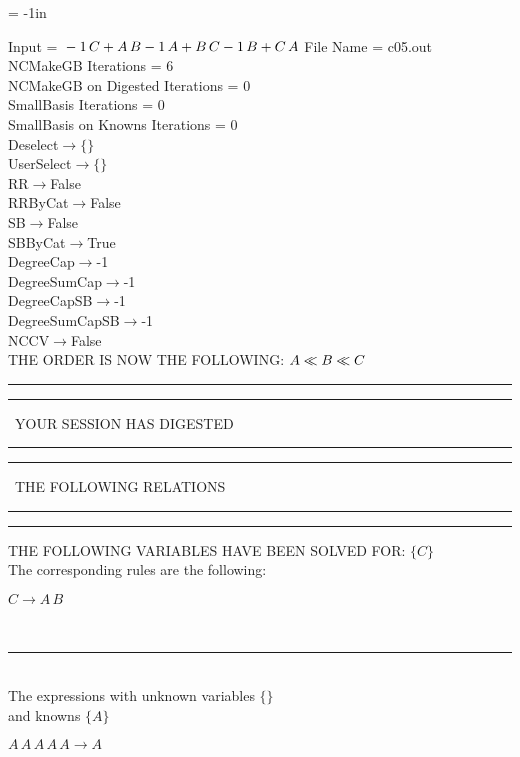 \voffset = -1in
\evensidemargin 0.1in
\oddsidemargin 0.1in
\textheight 9in
\textwidth 6in

\normalsize
\baselineskip=12pt
\noindent
Input = 
$
\\-1\,
 C + A\,
 B\\
-1\,
 A + B\,
 C\\
-1\,
 B + C\,
 A\\
$
File Name = c05.out\\
NCMakeGB Iterations = 6\\
NCMakeGB on Digested Iterations = 0\\
SmallBasis Iterations = 0\\
SmallBasis on Knowns Iterations = 0\\
Deselect$\rightarrow \{\}$\\
UserSelect$\rightarrow \{\}$\\
RR$\rightarrow $False\\
RRByCat$\rightarrow $False\\
SB$\rightarrow $False\\
SBByCat$\rightarrow $True\\
DegreeCap$\rightarrow $-1\\
DegreeSumCap$\rightarrow $-1\\
DegreeCapSB$\rightarrow $-1\\
DegreeSumCapSB$\rightarrow $-1\\
NCCV$\rightarrow $False\\
THE ORDER IS NOW THE FOLLOWING:\hfil\break
$
A\ll
B\ll
C\\
$
\rule[2pt]{6in}{4pt}\hfil\break
\rule[2pt]{1.879in}{4pt}
\ YOUR SESSION HAS DIGESTED\ 
\rule[2pt]{1.879in}{4pt}\hfil\break
\rule[2pt]{1.923in}{4pt}
\ THE FOLLOWING RELATIONS\ 
\rule[2pt]{1.923in}{4pt}\hfil\break
\rule[2pt]{6in}{4pt}\hfil\break
THE FOLLOWING VARIABLES HAVE BEEN SOLVED FOR:\hfil\break
$\{C\}$
\smallskip\\
The corresponding rules are the following:\smallskip\\
\begin{minipage}{6in}
$
C\rightarrow A\,
 B
$
\end{minipage}\medskip\\
\rule[3pt]{6in}{.7pt}\\
The expressions with unknown variables $\{\}$\\
and knowns $\{A\}$\smallskip\\
\begin{minipage}{6in}
$
A\,
 A\,
 A\,
 A\,
 A\rightarrow A
$
\end{minipage}\\
